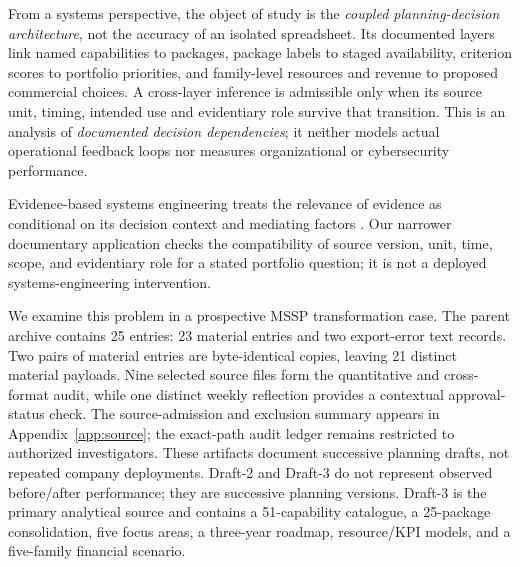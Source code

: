 \documentclass[systems,article,submit,moreauthors]{Definitions/mdpi}
\begin{document}
From a systems perspective, the object of study is the \emph{coupled planning-decision architecture}, not the accuracy of an isolated spreadsheet. Its documented layers link named capabilities to packages, package labels to staged availability, criterion scores to portfolio priorities, and family-level resources and revenue to proposed commercial choices. A cross-layer inference is admissible only when its source unit, timing, intended use and evidentiary role survive that transition. This is an analysis of \emph{documented decision dependencies}; it neither models actual operational feedback loops nor measures organizational or cybersecurity performance.

Evidence-based systems engineering treats the relevance of evidence as conditional on its decision context and mediating factors \cite{Hybertson2018}. Our narrower documentary application checks the compatibility of source version, unit, time, scope, and evidentiary role for a stated portfolio question; it is not a deployed systems-engineering intervention.

We examine this problem in a prospective MSSP transformation case. The parent archive contains 25 entries: 23 material entries and two export-error text records. Two pairs of material entries are byte-identical copies, leaving 21 distinct material payloads. Nine selected source files form the quantitative and cross-format audit, while one distinct weekly reflection provides a contextual approval-status check. The source-admission and exclusion summary appears in Appendix~\ref{app:source}; the exact-path audit ledger remains restricted to authorized investigators. These artifacts document successive planning drafts, not repeated company deployments. Draft-2 and Draft-3 do not represent observed before/after performance; they are successive planning versions. Draft-3 is the primary analytical source and contains a 51-capability catalogue, a 25-package consolidation, five focus areas, a three-year roadmap, resource/KPI models, and a five-family financial scenario.
\end{document}
